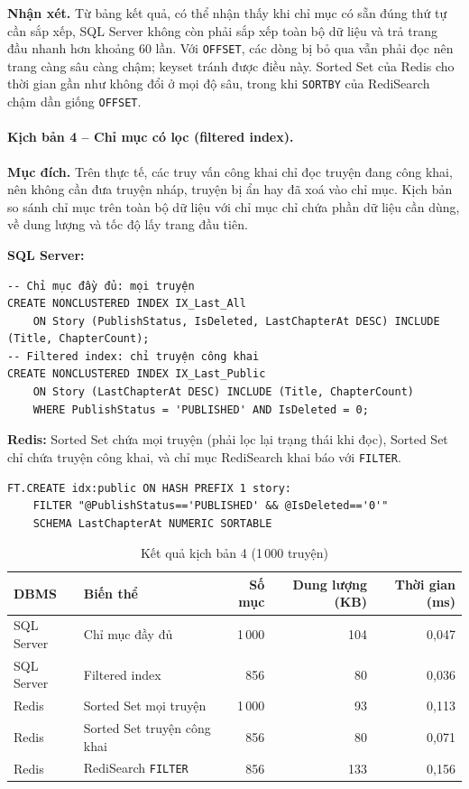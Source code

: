 \textbf{Nhận xét.} Từ bảng kết quả, có thể nhận thấy khi chỉ mục có sẵn đúng thứ tự cần sắp xếp, SQL Server không còn phải sắp xếp toàn bộ dữ liệu và trả trang đầu nhanh hơn khoảng 60 lần. Với \texttt{OFFSET}, các dòng bị bỏ qua vẫn phải đọc nên trang càng sâu càng chậm; keyset tránh được điều này. Sorted Set của Redis cho thời gian gần như không đổi ở mọi độ sâu, trong khi \texttt{SORTBY} của RediSearch chậm dần giống \texttt{OFFSET}.

\paragraph{Kịch bản 4 -- Chỉ mục có lọc (filtered index).}

\textbf{Mục đích.} Trên thực tế, các truy vấn công khai chỉ đọc truyện đang công khai, nên không cần đưa truyện nháp, truyện bị ẩn hay đã xoá vào chỉ mục. Kịch bản so sánh chỉ mục trên toàn bộ dữ liệu với chỉ mục chỉ chứa phần dữ liệu cần dùng, về dung lượng và tốc độ lấy trang đầu tiên.

\textbf{SQL Server:}

\begin{verbatim}
-- Chỉ mục đầy đủ: mọi truyện
CREATE NONCLUSTERED INDEX IX_Last_All
    ON Story (PublishStatus, IsDeleted, LastChapterAt DESC) INCLUDE (Title, ChapterCount);
-- Filtered index: chỉ truyện công khai
CREATE NONCLUSTERED INDEX IX_Last_Public
    ON Story (LastChapterAt DESC) INCLUDE (Title, ChapterCount)
    WHERE PublishStatus = 'PUBLISHED' AND IsDeleted = 0;
\end{verbatim}

\textbf{Redis:} Sorted Set chứa mọi truyện (phải lọc lại trạng thái khi đọc), Sorted Set chỉ chứa truyện công khai, và chỉ mục RediSearch khai báo với \texttt{FILTER}.

\begin{verbatim}
FT.CREATE idx:public ON HASH PREFIX 1 story:
    FILTER "@PublishStatus=='PUBLISHED' && @IsDeleted=='0'"
    SCHEMA LastChapterAt NUMERIC SORTABLE
\end{verbatim}

\begin{table}[H]
\centering\small
\begin{tabular}{|l|l|r|r|r|}
\hline
\textbf{DBMS} & \textbf{Biến thể} & \textbf{Số mục} & \textbf{Dung lượng (KB)} & \textbf{Thời gian (ms)} \\ \hline
SQL Server & Chỉ mục đầy đủ & 1\,000 & 104 & 0,047 \\ \hline
SQL Server & Filtered index & 856 & 80 & 0,036 \\ \hline
Redis & Sorted Set mọi truyện & 1\,000 & 93 & 0,113 \\ \hline
Redis & Sorted Set truyện công khai & 856 & 80 & 0,071 \\ \hline
Redis & RediSearch \texttt{FILTER} & 856 & 133 & 0,156 \\ \hline
\end{tabular}
\caption{Kết quả kịch bản 4 (1\,000 truyện)}
\label{tab:idx-i4}
\end{table}

